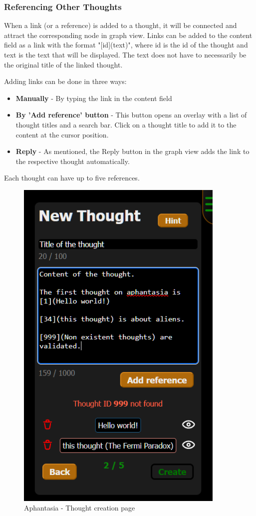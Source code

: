 \subsubsection*{Referencing Other Thoughts}
When a link (or a reference) is added to a thought, it will be connected and attract the corresponding node in graph view.
Links can be added to the content field as a link with the format "[id](text)",
where id is the id of the thought and text is the text that will be displayed.
The text does not have to necessarily be the original title of the linked thought.

Adding links can be done in three ways:
\begin{itemize}
  \item \textbf{Manually} - By typing the link in the content field
  \item \textbf{By 'Add reference' button} - This button opens an overlay with a list of thought titles and a search bar.
 Click on a thought title to add it to the content at the cursor position.
  \item \textbf{Reply} - As mentioned, the Reply button in the graph view adds the link to the respective thought automatically.
\end{itemize}

Each thought can have up to five references.

\begin{figure}[h]\centering
  \includegraphics[width=100mm, keepaspectratio]{img/afantazie_thought_creation_page.png}
  \caption{Aphantasia - Thought creation page}
  \label{obr:afantazie_thought_creation_page}
\end{figure}

